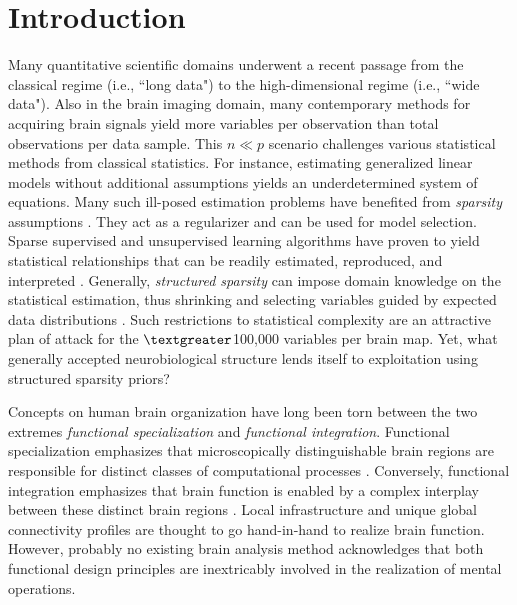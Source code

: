 \documentclass{article}
\begin{document}
\section{Introduction}
Many quantitative scientific domains underwent a
recent passage from the classical regime (i.e., ``long data")  to
the high-dimensional regime (i.e., ``wide data").
Also in the brain imaging domain,
many contemporary methods for acquiring brain signals yield
more variables per observation than
total observations per data sample.
This $n \ll p$ scenario challenges various statistical methods from
classical statistics.
For instance,
estimating generalized linear models without additional assumptions
yields an underdetermined system of equations.
%
Many such ill-posed estimation problems
have benefited from
\textit{sparsity} assumptions
\cite{hastie2015statistical}.
They act as a 
regularizer and can be used for model selection.
Sparse supervised and unsupervised
learning algorithms have proven to yield
statistical relationships that can be readily
estimated, reproduced, and interpreted
\cite{giraud2014introduction}.
%
Generally, \textit{structured sparsity} can impose
domain knowledge on the 
statistical estimation,
thus shrinking and selecting variables guided by
expected data distributions
\cite{bach2012optimization}.
Such restrictions to statistical complexity
are an attractive plan of attack
for the $\textgreater$100,000 variables per brain map.
Yet, what generally accepted neurobiological structure lends itself
to exploitation using structured sparsity priors?



Concepts on human brain organization have long been torn
between the two extremes
\textit{functional specialization} and \textit{functional integration}.
Functional specialization emphasizes that microscopically distinguishable
brain regions are responsible for distinct classes of computational 
processes
\cite{kanwisher2010functional}.
Conversely, functional integration emphasizes that brain function
is enabled by a complex interplay between these
distinct brain regions \cite{sporns14nn}.
%
Local
infrastructure
and unique global connectivity profiles are thought to go hand-in-hand
to realize brain function.
%
However,
probably no existing brain analysis method acknowledges that
both functional design principles are inextricably involved
in the realization of mental operations.
\end{document}
